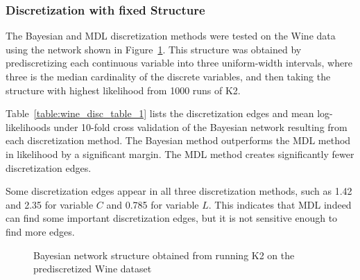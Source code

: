 \subsubsection{Discretization with fixed Structure}
\label{subsubsec:wine_exp1}

The Bayesian and MDL discretization methods were tested on the Wine data using the network shown in Figure~\ref{fig:wine_graph_1}.
This structure was obtained by prediscretizing each continuous variable into three uniform-width intervals, where three is the median cardinality of the discrete variables, and then taking the structure with highest likelihood from \num{1000} runs of K2.

Table~\ref{table:wine_disc_table_1} lists the discretization edges and mean log-likelihoods under \num{10}-fold cross validation of the Bayesian network resulting from each discretization method.
The Bayesian method outperforms the MDL method in likelihood by a significant margin.
The MDL method creates significantly fewer discretization edges.

Some discretization edges appear in all three discretization methods, such as \num{1.42} and \num{2.35} for variable $C$ and \num{0.785} for variable $L$.
This indicates that MDL indeed can find some important discretization edges, but it is not sensitive enough to find more edges.

\begin{figure}[ht]
  \centering
  \scalebox{0.8}{}
  \caption{Bayesian network structure obtained from running K2 on the prediscretized Wine dataset}
  \label{fig:wine_graph_1}
\end{figure}

\begin{table}
  \centering
  \caption{
    Results from discretization of the Wine MPG dataset with fixed structure.
    Bold discretization edges were identified by both methods.
  }
  \scalebox{1.0}{
  
  }
  \label{table:wine_disc_table_1}
\end{table}

